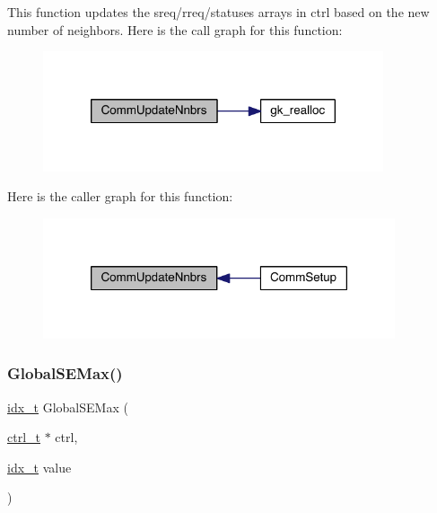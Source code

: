 This function updates the sreq/rreq/statuses arrays in ctrl based on the new number of neighbors. Here is the call graph for this function\+:\nopagebreak
\begin{figure}[H]
\begin{center}
\leavevmode
\includegraphics[width=284pt]{a00344_a245110080c4fe1712c5cac4a52e61e69_cgraph}
\end{center}
\end{figure}
Here is the caller graph for this function\+:\nopagebreak
\begin{figure}[H]
\begin{center}
\leavevmode
\includegraphics[width=294pt]{a00344_a245110080c4fe1712c5cac4a52e61e69_icgraph}
\end{center}
\end{figure}
\mbox{\label{a00344_a51be32add0e43ecdac3f0b982a0733b4}} 
\subsubsection{\texorpdfstring{Global\+S\+E\+Max()}{GlobalSEMax()}}
{\footnotesize\ttfamily \hyperlink{a00876_aaa5262be3e700770163401acb0150f52}{idx\+\_\+t} Global\+S\+E\+Max (\begin{DoxyParamCaption}\item[{\hyperlink{a00742}{ctrl\+\_\+t} $\ast$}]{ctrl,  }\item[{\hyperlink{a00876_aaa5262be3e700770163401acb0150f52}{idx\+\_\+t}}]{value }\end{DoxyParamCaption})}

